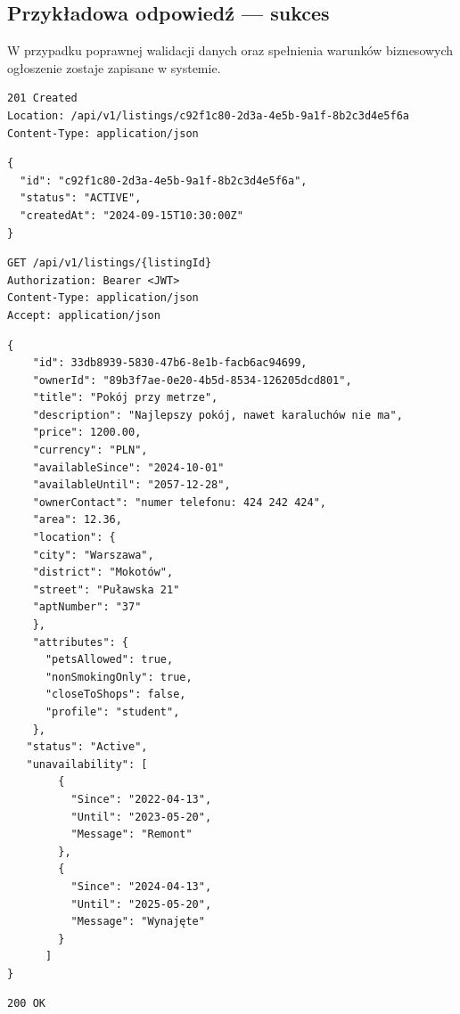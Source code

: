 \documentclass[11pt, a4paper]{article}
\begin{document}
\subsection{Przykładowa odpowiedź — sukces}

W przypadku poprawnej walidacji danych oraz spełnienia warunków biznesowych
ogłoszenie zostaje zapisane w systemie.

\begin{lstlisting}[style=http,caption={Odpowiedź HTTP — sukces}]
201 Created
Location: /api/v1/listings/c92f1c80-2d3a-4e5b-9a1f-8b2c3d4e5f6a
Content-Type: application/json  
\end{lstlisting}

\begin{lstlisting}[style=json,caption={Ciało odpowiedzi — sukces}]
{
  "id": "c92f1c80-2d3a-4e5b-9a1f-8b2c3d4e5f6a",
  "status": "ACTIVE",
  "createdAt": "2024-09-15T10:30:00Z"
}
\end{lstlisting}

\begin{lstlisting}[style=http,caption={Żądanie HTTP — pobranie szczegółów ogłoszenia}]
GET /api/v1/listings/{listingId}
Authorization: Bearer <JWT>
Content-Type: application/json
Accept: application/json
\end{lstlisting}

\begin{lstlisting}[style=json,caption={Ciało żądania — pobranie szczegółów ogłoszenia}]
{
    "id": 33db8939-5830-47b6-8e1b-facb6ac94699,
    "ownerId": "89b3f7ae-0e20-4b5d-8534-126205dcd801",
    "title": "Pokój przy metrze",
    "description": "Najlepszy pokój, nawet karaluchów nie ma",
    "price": 1200.00,
    "currency": "PLN",
    "availableSince": "2024-10-01"
    "availableUntil": "2057-12-28",
    "ownerContact": "numer telefonu: 424 242 424",
    "area": 12.36,
    "location": {
    "city": "Warszawa",
    "district": "Mokotów",
    "street": "Puławska 21"
    "aptNumber": "37"
    },
    "attributes": {
      "petsAllowed": true,
      "nonSmokingOnly": true,
      "closeToShops": false,
      "profile": "student",
    },
   "status": "Active",
   "unavailability": [
        {
          "Since": "2022-04-13",
          "Until": "2023-05-20",
          "Message": "Remont"
        },
        {
          "Since": "2024-04-13",
          "Until": "2025-05-20",
          "Message": "Wynajęte"
        }
      ] 
}
\end{lstlisting}

\begin{lstlisting}[style=http,caption={Odpowiedź HTTP — sukces}]
200 OK
\end{lstlisting}
\end{document}
